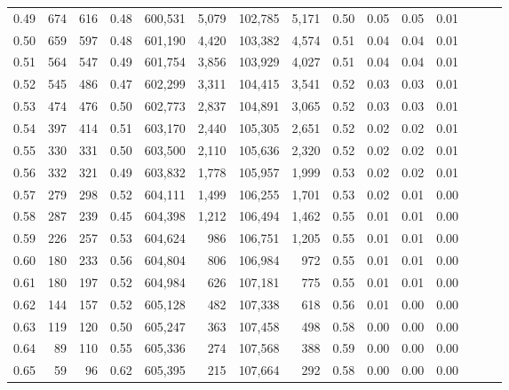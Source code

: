 \begin{tabular}{rrrrrrrrrrrrrrr}
0.49 &     674 &    616 &  0.48 &  600,531 &    5,079 &  102,785 &    5,171 &  0.50 &  0.05 &  0.05 &      0.01 \\
0.50 &     659 &    597 &  0.48 &  601,190 &    4,420 &  103,382 &    4,574 &  0.51 &  0.04 &  0.04 &      0.01 \\
0.51 &     564 &    547 &  0.49 &  601,754 &    3,856 &  103,929 &    4,027 &  0.51 &  0.04 &  0.04 &      0.01 \\
0.52 &     545 &    486 &  0.47 &  602,299 &    3,311 &  104,415 &    3,541 &  0.52 &  0.03 &  0.03 &      0.01 \\
0.53 &     474 &    476 &  0.50 &  602,773 &    2,837 &  104,891 &    3,065 &  0.52 &  0.03 &  0.03 &      0.01 \\
0.54 &     397 &    414 &  0.51 &  603,170 &    2,440 &  105,305 &    2,651 &  0.52 &  0.02 &  0.02 &      0.01 \\
0.55 &     330 &    331 &  0.50 &  603,500 &    2,110 &  105,636 &    2,320 &  0.52 &  0.02 &  0.02 &      0.01 \\
0.56 &     332 &    321 &  0.49 &  603,832 &    1,778 &  105,957 &    1,999 &  0.53 &  0.02 &  0.02 &      0.01 \\
0.57 &     279 &    298 &  0.52 &  604,111 &    1,499 &  106,255 &    1,701 &  0.53 &  0.02 &  0.01 &      0.00 \\
0.58 &     287 &    239 &  0.45 &  604,398 &    1,212 &  106,494 &    1,462 &  0.55 &  0.01 &  0.01 &      0.00 \\
0.59 &     226 &    257 &  0.53 &  604,624 &      986 &  106,751 &    1,205 &  0.55 &  0.01 &  0.01 &      0.00 \\
0.60 &     180 &    233 &  0.56 &  604,804 &      806 &  106,984 &      972 &  0.55 &  0.01 &  0.01 &      0.00 \\
0.61 &     180 &    197 &  0.52 &  604,984 &      626 &  107,181 &      775 &  0.55 &  0.01 &  0.01 &      0.00 \\
0.62 &     144 &    157 &  0.52 &  605,128 &      482 &  107,338 &      618 &  0.56 &  0.01 &  0.00 &      0.00 \\
0.63 &     119 &    120 &  0.50 &  605,247 &      363 &  107,458 &      498 &  0.58 &  0.00 &  0.00 &      0.00 \\
0.64 &      89 &    110 &  0.55 &  605,336 &      274 &  107,568 &      388 &  0.59 &  0.00 &  0.00 &      0.00 \\
0.65 &      59 &     96 &  0.62 &  605,395 &      215 &  107,664 &      292 &  0.58 &  0.00 &  0.00 &      0.00 \\

\end{tabular}
